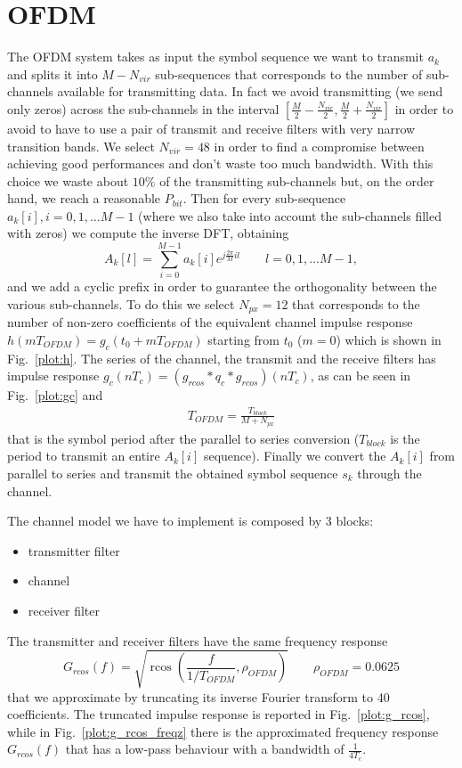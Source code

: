 \documentclass[a4paper,oneside]{article}
\DeclareMathOperator*{\rcos}{rcos}
\begin{document}
\section{OFDM}
\label{sec:ofdm}
The OFDM system takes as input the symbol sequence we want to transmit $a_k$ and splits it into $M-N_{vir}$ sub-sequences that corresponds to the number of sub-channels available for transmitting data. In fact we avoid transmitting (we send only zeros) across the sub-channels in the interval $[\frac{M}{2}-\frac{N_{vir}}{2},\frac{M}{2}+\frac{N_{vir}}{2}]$ in order to avoid to have to use a pair of transmit and receive filters with very narrow transition bands.
We select $N_{vir} = 48$ in order to find a compromise between achieving good performances and don't waste too much bandwidth. With this choice we waste about $ 10\% $ of the transmitting sub-channels but, on the order hand, we reach a reasonable $ P_{bit} $.
Then for every sub-sequence $a_k[i], i = 0,1,\dots M-1$ (where we also take into account the sub-channels filled with zeros) we compute the inverse DFT, obtaining
\begin{equation}
  A_k[l] = \sum_{i=0}^{M-1}a_k[i]e^{j\frac{2\pi}{M}il} \qquad l=0,1,\dots M-1 ,
\end{equation}
and we add a cyclic prefix in order to guarantee the orthogonality between the various sub-channels. To do this we select $N_{px} = 12$ that corresponds to the number of  non-zero coefficients of the equivalent channel impulse response $h(mT_{OFDM}) = g_c(t_0+ mT_{OFDM})$ starting from $t_0$ ($m = 0$) which is shown in Fig.~\ref{plot:h}. The series of the channel, the transmit and the receive filters has impulse response $g_c(nT_c) = \left(g_{rcos}*q_c*g_{rcos}\right)(nT_c)$, as can be seen in Fig.~\ref{plot:gc} and 
\begin{align*}
T_{OFDM} = \frac{T_{block}}{M+N_{px}}
\end{align*} 
that is the symbol period after the parallel to series conversion ($T_{block}$ is the period to transmit an entire $A_k[i]$ sequence).
Finally we convert the $A_k[i]$ from parallel to series and transmit the obtained symbol sequence $s_k$ through the channel.

The channel model we have to implement is composed by 3 blocks:
\begin{itemize}
\item transmitter filter
\item channel
\item receiver filter
\end{itemize} 
The transmitter and receiver filters have the same frequency response
\begin{equation}
  G_{rcos}(f) = \sqrt{\rcos\left(\frac{f}{1/T_{OFDM}}, \rho_{OFDM}\right)} \qquad \rho_{OFDM} = 0.0625
\end{equation}
that we approximate by truncating its inverse Fourier transform to 40
coefficients.
The truncated impulse response is reported in Fig.~\ref{plot:g_rcos}, while in Fig.~\ref{plot:g_rcos_freqz} there is the approximated frequency response $G_{rcos}(f)$ that has a low-pass behaviour with a bandwidth of $\frac{1}{4T_c}$.
\end{document}
